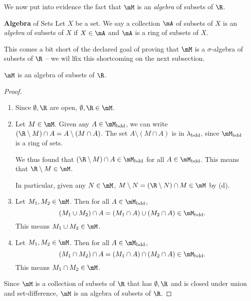 \documentclass[pmath450]{subfiles}
\begin{document}
    \np We now put into evidence the fact that $\mM$ is an \textit{algebra} of subsets of $\R$.

    \begin{definition}{\textbf{Algebra} of Sets}
        Let $X$ be a set. We say a collection $\mA$ of subsets of $X$ is an \emph{algebra} of subsets of $X$ if $X\in\mA$ and $\mA$ is a ring of subsets of $X$.
    \end{definition}

    \np This comes a bit short of the declared goal of proving that $\mM$ is a $\sigma$-algebra of subsets of $\R$ -- we wil lfix this shortcoming on the next subsection.

    \begin{prop}{}
        $\mM$ is an algebra of subsets of $\R$.
    \end{prop}

    \begin{proof}
        \begin{enumerate}
            \item Since $\emptyset,\R$ are open, $\emptyset,\R\in\mM$.
            \item Let $M\in\mM$. Given any $A\in\mM_{\bdd}$, we can write $\left( \R\setminus M \right)\cap A = A\setminus\left( M\cap A \right)$. The set $A\setminus \left( M\cap A \right)$ is in $\lambda_{\operatorname{bdd}}$, since $\mM_{\bdd}$ is a ring of sets.

                We thus found that $\left( \R\setminus M \right)\cap A\in\mM_{\bdd}$ for all $A\in\mM_{\bdd}$. This means that $\R\setminus M\in\mM$. 

                In particular, given any $N\in\mM$, $M\setminus N = \left( \R\setminus N \right)\cap M\in\mM$ by (d).

            \item Let $M_1,M_2\in\mM$. Then for all $A\in\mM_{\bdd}$,
                \begin{equation*}
                    \left( M_1\cup M_2 \right)\cap A = \left( M_1\cap A \right)\cup \left( M_2\cap A \right)\in\mM_{\bdd}.
                \end{equation*}
                This means $M_1\cup M_2\in\mM$.

            \item Let $M_1,M_2\in\mM$. Then for all $A\in\mM_{\bdd}$,
                \begin{equation*}
                    \left( M_1\cap M_2 \right)\cap A = \left( M_1\cap A \right)\cap \left( M_2\cap A \right)\in\mM_{\bdd}.
                \end{equation*}
                This means $M_1\cap M_2\in\mM$.
        \end{enumerate}
        Since $\mM$ is a collection of subsets of $\R$ that has $\emptyset,\R$ and is closed under union and set-difference, $\mM$ is an algebra of subsets of $\R$.
    \end{proof}
\end{document}
